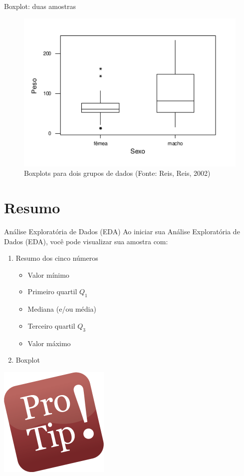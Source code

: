 \documentclass{beamer}
\begin{document}
\begin{frame}{Boxplot: duas amostras}
  \begin{figure}
    \centering
    \includegraphics[height=0.7\textheight]{boxplot3}
    \caption{Boxplots para dois grupos de dados (Fonte: Reis, Reis,
      2002)}
  \end{figure}
\end{frame}

\section{Resumo}

\begin{frame}{Análise Exploratória de Dados (EDA)}
  Ao iniciar sua Análise Exploratória de Dados (EDA), você pode
  visualizar sua amostra com:
  \begin{enumerate}
  \item Resumo dos cinco números
    \begin{itemize}
    \item Valor mínimo
    \item Primeiro quartil $Q_1$
    \item Mediana (e/ou média)
    \item Terceiro quartil $Q_3$
    \item Valor máximo
    \end{itemize}
  \item Boxplot
  \end{enumerate}
  \begin{center}
  \includegraphics[height=0.2\textheight]{protip}
  \end{center}
\end{frame}
\end{document}
